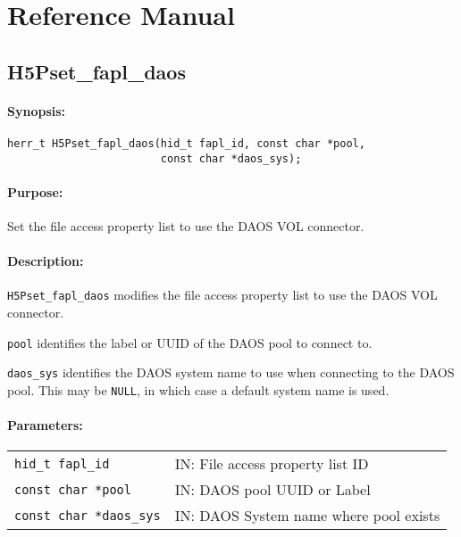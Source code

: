 \documentclass[../users_guide.tex]{subfiles}
\begin{document}
\section{Reference Manual}
\label{apdx:ref_manual}

\subsection{H5Pset\_fapl\_daos}
\label{ref:h5pset_fapl_daos}

\paragraph{Synopsis:}
\begin{flushleft}%
\begin{verbatim}
herr_t H5Pset_fapl_daos(hid_t fapl_id, const char *pool,
                        const char *daos_sys);
\end{verbatim}
\end{flushleft}%

\paragraph{Purpose:}
\begin{flushleft}%
Set the file access property list to use the DAOS VOL connector.
\end{flushleft}%

\paragraph{Description:}
\begin{flushleft}%
\texttt{H5Pset\_fapl\_daos} modifies the file access property list to use the
DAOS VOL connector.

\texttt{pool} identifies the label or UUID of the DAOS pool to connect to.

\texttt{daos\_sys} identifies the DAOS system name to use when connecting to
the DAOS pool. This may be \texttt{NULL}, in which case a default system name is used.
\end{flushleft}%

\paragraph{Parameters:}
\begin{flushleft}%
 \begin{tabular}{ll}%
   \texttt{hid\_t fapl\_id} & IN: File access property list ID \\
   \texttt{const char *pool} & IN: DAOS pool UUID or Label \\
   \texttt{const char *daos\_sys} & IN: DAOS System name where pool exists \\
 \end{tabular}%
\end{flushleft}%
\end{document}
